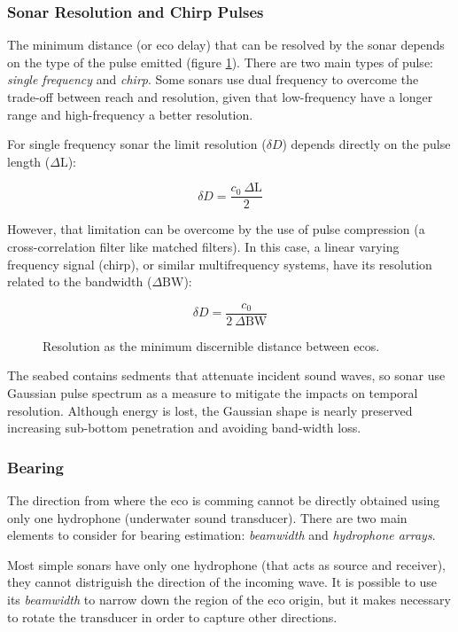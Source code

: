 \subsubsection{Sonar Resolution and Chirp Pulses}

The minimum distance (or eco delay) that can be resolved by the sonar depends on
the type of the pulse emitted (figure \ref{fig:chirpresolution}). There are two
main types of pulse:
\textit{single frequency} and \textit{chirp}\cite{chirp,gaussianchirp}. Some
sonars use dual frequency to overcome the trade-off between reach and resolution, given that low-frequency have a longer
range and high-frequency a better resolution.

For single frequency sonar the limit resolution ($\delta D$) depends directly on
the pulse length ($\Delta\text{L}$):

\[ \delta D = \frac{c_0~\Delta\text{L}}{2} \] 

However, that limitation can be overcome by the use of pulse compression (a
cross-correlation filter like matched filters). In this case, a linear varying
frequency signal (chirp), or similar multifrequency systems, have its resolution
related to the bandwidth ($\Delta \text{BW}$):

\[ \delta D = \frac{c_0}{2~\Delta \text{BW}} \]

\begin{figure}
	\centering
	
	\caption{Resolution as the minimum discernible distance between ecos.}
	\label{fig:chirpresolution}
\end{figure}

The seabed contains sedments that attenuate incident sound waves, so sonar use
Gaussian pulse spectrum as a measure to mitigate the impacts on temporal
resolution. Although energy is lost, the Gaussian shape is nearly preserved
increasing sub-bottom penetration and avoiding band-width loss.

\subsubsection{Bearing}

The direction from where the eco is comming cannot be directly obtained using
only one hydrophone (underwater sound transducer). There are two main elements
to consider for bearing estimation: \textit{beamwidth} and \textit{hydrophone
arrays}.

Most simple sonars have only one hydrophone (that acts as source and receiver),
they cannot distriguish the direction of the incoming wave. It is possible
to use its \textit{beamwidth} to narrow down the region of the eco origin, but
it makes necessary to rotate the transducer in order to capture other
directions.

